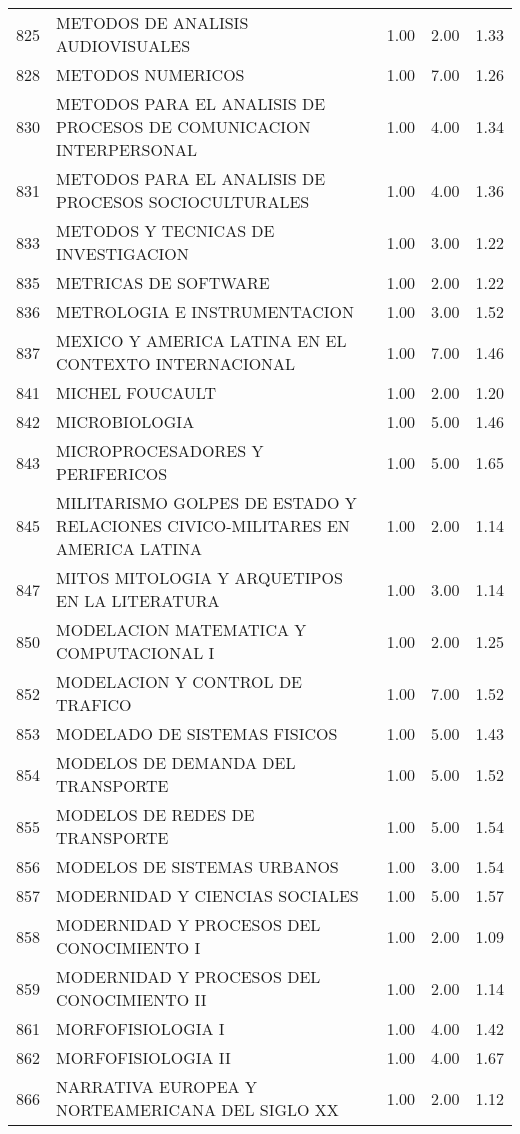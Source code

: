 \begin{table}[ht]
\begin{tabular}{rlrrr}
  825 & METODOS DE ANALISIS AUDIOVISUALES & 1.00 & 2.00 & 1.33 \\ 
  828 & METODOS NUMERICOS & 1.00 & 7.00 & 1.26 \\ 
  830 & METODOS PARA EL ANALISIS DE PROCESOS DE COMUNICACION INTERPERSONAL & 1.00 & 4.00 & 1.34 \\ 
  831 & METODOS PARA EL ANALISIS DE PROCESOS SOCIOCULTURALES & 1.00 & 4.00 & 1.36 \\ 
  833 & METODOS Y TECNICAS DE INVESTIGACION & 1.00 & 3.00 & 1.22 \\ 
  835 & METRICAS DE SOFTWARE & 1.00 & 2.00 & 1.22 \\ 
  836 & METROLOGIA E INSTRUMENTACION & 1.00 & 3.00 & 1.52 \\ 
  837 & MEXICO Y AMERICA LATINA EN EL CONTEXTO INTERNACIONAL & 1.00 & 7.00 & 1.46 \\ 
  841 & MICHEL FOUCAULT & 1.00 & 2.00 & 1.20 \\ 
  842 & MICROBIOLOGIA & 1.00 & 5.00 & 1.46 \\ 
  843 & MICROPROCESADORES Y PERIFERICOS & 1.00 & 5.00 & 1.65 \\ 
  845 & MILITARISMO GOLPES DE ESTADO Y RELACIONES CIVICO-MILITARES EN AMERICA LATINA & 1.00 & 2.00 & 1.14 \\ 
  847 & MITOS MITOLOGIA Y ARQUETIPOS EN LA LITERATURA & 1.00 & 3.00 & 1.14 \\ 
  850 & MODELACION MATEMATICA Y COMPUTACIONAL I & 1.00 & 2.00 & 1.25 \\ 
  852 & MODELACION Y CONTROL DE TRAFICO & 1.00 & 7.00 & 1.52 \\ 
  853 & MODELADO DE SISTEMAS FISICOS & 1.00 & 5.00 & 1.43 \\ 
  854 & MODELOS DE DEMANDA DEL TRANSPORTE & 1.00 & 5.00 & 1.52 \\ 
  855 & MODELOS DE REDES DE TRANSPORTE & 1.00 & 5.00 & 1.54 \\ 
  856 & MODELOS DE SISTEMAS URBANOS & 1.00 & 3.00 & 1.54 \\ 
  857 & MODERNIDAD Y CIENCIAS SOCIALES & 1.00 & 5.00 & 1.57 \\ 
  858 & MODERNIDAD Y PROCESOS DEL CONOCIMIENTO I & 1.00 & 2.00 & 1.09 \\ 
  859 & MODERNIDAD Y PROCESOS DEL CONOCIMIENTO II & 1.00 & 2.00 & 1.14 \\ 
  861 & MORFOFISIOLOGIA I & 1.00 & 4.00 & 1.42 \\ 
  862 & MORFOFISIOLOGIA II & 1.00 & 4.00 & 1.67 \\ 
  866 & NARRATIVA EUROPEA Y NORTEAMERICANA DEL SIGLO XX & 1.00 & 2.00 & 1.12 \\ 

\end{tabular}
\end{table}
